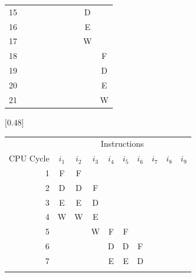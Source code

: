 \begin{table}
{{\begin{tabular}{rccccccccc}
                15 &   &   &   &   &   &   &   & D &   \\ \rowcolor[gray]{.975}
                16 &   &   &   &   &   &   &   & E &   \\
                17 &   &   &   &   &   &   &   & W &   \\ \rowcolor[gray]{.975}
                18 &   &   &   &   &   &   &   &   & F \\
                19 &   &   &   &   &   &   &   &   & D \\ \rowcolor[gray]{.975}
                20 &   &   &   &   &   &   &   &   & E \\
                21 &   &   &   &   &   &   &   &   & W \\
                \bottomrule
            \end{tabular}
        }
        \vfill
        [0.48\textwidth]{%
            \begin{tabular}{rccccccccc} \toprule
                & \multicolumn{9}{c}{\fontsize{11pt}{9pt}\selectfont Instructions} \\
                \cmidrule{2-10}
                {\fontsize{11pt}{9pt}\selectfont CPU Cycle} & 
                {\fontsize{11pt}{9pt}\selectfont $i_1$} & 
                {\fontsize{11pt}{9pt}\selectfont $i_2$} & 
                {\fontsize{11pt}{9pt}\selectfont $i_3$} & 
                {\fontsize{11pt}{9pt}\selectfont $i_4$} & 
                {\fontsize{11pt}{9pt}\selectfont $i_5$} & 
                {\fontsize{11pt}{9pt}\selectfont $i_6$} & 
                {\fontsize{11pt}{9pt}\selectfont $i_7$} & 
                {\fontsize{11pt}{9pt}\selectfont $i_8$} & 
                {\fontsize{11pt}{9pt}\selectfont $i_9$} \\
                \midrule
                 1 & F & F &   &   &   &   &   &   &   \\ \rowcolor[gray]{.975}
                 2 & D & D & F &   &   &   &   &   &   \\
                 3 & E & E & D &   &   &   &   &   &   \\ \rowcolor[gray]{.975}
                 4 & W & W & E &   &   &   &   &   &   \\
                 5 &   &   & W & F & F &   &   &   &   \\ \rowcolor[gray]{.975}
                 6 &   &   &   & D & D & F &   &   &   \\
                 7 &   &   &   & E & E & D &   &   &   \\ \rowcolor[gray]{.975}

\end{tabular}}}
\end{table}
